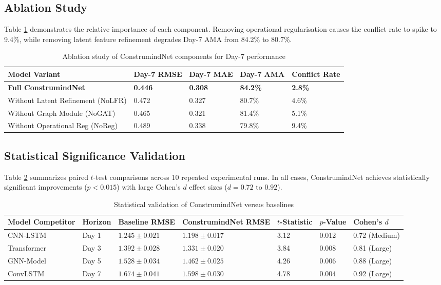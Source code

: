 \documentclass[pdflatex,sn-mathphys,Numbered]{sn-jnl}%
\begin{document}
\subsection{Ablation Study}
Table \ref{tab6} demonstrates the relative importance of each component. Removing operational regularisation causes the conflict rate to spike to 9.4\%, while removing latent feature refinement degrades Day-7 AMA from 84.2\% to 80.7\%.

\begin{table}[h]
\caption{Ablation study of ConstrumindNet components for Day-7 performance}\label{tab6}
\begin{tabular}{@{}lllll@{}}
\toprule
Model Variant & Day-7 RMSE & Day-7 MAE & Day-7 AMA & Conflict Rate \\
\midrule
\textbf{Full ConstrumindNet} & \textbf{0.446} & \textbf{0.308} & \textbf{84.2\%} & \textbf{2.8\%} \\
Without Latent Refinement (NoLFR) & 0.472 & 0.327 & 80.7\% & 4.6\% \\
Without Graph Module (NoGAT) & 0.465 & 0.321 & 81.4\% & 5.1\% \\
Without Operational Reg (NoReg) & 0.489 & 0.338 & 79.8\% & 9.4\% \\
\bottomrule
\end{tabular}
\end{table}

\subsection{Statistical Significance Validation}
Table \ref{tab7} summarizes paired $t$-test comparisons across 10 repeated experimental runs. In all cases, ConstrumindNet achieves statistically significant improvements ($p < 0.015$) with large Cohen's $d$ effect sizes ($d = 0.72$ to $0.92$).

\begin{table}[t]
\caption{Statistical validation of ConstrumindNet versus baselines}\label{tab7}
\begin{tabular*}{\textwidth}{@{\extracolsep\fill}lllllll@{\extracolsep\fill}}
\toprule
Model Competitor & Horizon & Baseline RMSE & ConstrumindNet RMSE & $t$-Statistic & $p$-Value & Cohen's $d$ \\
\midrule
CNN-LSTM & Day 1 & $1.245 \pm 0.021$ & $1.198 \pm 0.017$ & 3.12 & 0.012 & 0.72 (Medium) \\
Transformer & Day 3 & $1.392 \pm 0.028$ & $1.331 \pm 0.020$ & 3.84 & 0.008 & 0.81 (Large) \\
GNN-Model & Day 5 & $1.528 \pm 0.034$ & $1.462 \pm 0.025$ & 4.26 & 0.006 & 0.88 (Large) \\
ConvLSTM & Day 7 & $1.674 \pm 0.041$ & $1.598 \pm 0.030$ & 4.78 & 0.004 & 0.92 (Large) \\
\bottomrule
\end{tabular*}
\end{table}
\end{document}
